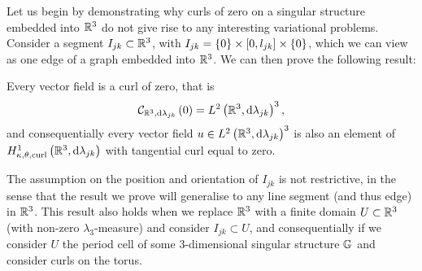 Let us begin by demonstrating why curls of zero on a singular structure embedded into $\mathbb{R}^3$ do not give rise to any interesting variational problems.
Consider a segment $I_{jk}\subset\mathbb{R}^3$, with $I_{jk} = \left\{ 0 \right\}\times\left[ 0,l_{jk} \right]\times\left\{ 0 \right\}$, which we can view as one edge of a graph embedded into $\mathbb{R}^3$.
We can then prove the following result:
\begin{prop} \label{prop:3DGraph-CurlsAreZero}
	Every vector field is a curl of zero, that is
	\begin{align*}
		\mathcal{C}_{ \mathbb{R}^3, \mathrm{d}\lambda_{jk}}\left( 0 \right) = L^{2}\left( \mathbb{R}^3,\mathrm{d} \lambda_{jk} \right)^3,
	\end{align*}
	and consequentially every vector field $u\in L^{2}\left( \mathbb{R}^3,\mathrm{d} \lambda_{jk} \right)^3$ is also an element of $H^1_{\kappa,\theta,\mathrm{curl}}\left( \mathbb{R}^3, \mathrm{d}\lambda_{jk} \right)$ with tangential curl equal to zero.
\end{prop}
The assumption on the position and orientation of $I_{jk}$ is not restrictive, in the sense that the result we prove will generalise to any line segment (and thus edge) in $\mathbb{R}^3$.
This result also holds when we replace $\mathbb{R}^3$ with a finite domain $U\subset\mathbb{R}^3$ (with non-zero $\lambda_3$-measure) and consider $I_{jk}\subset U$, and consequentially if we consider $U$ the period cell of some 3-dimensional singular structure $\mathbb{G}$ and consider curls on the torus.
